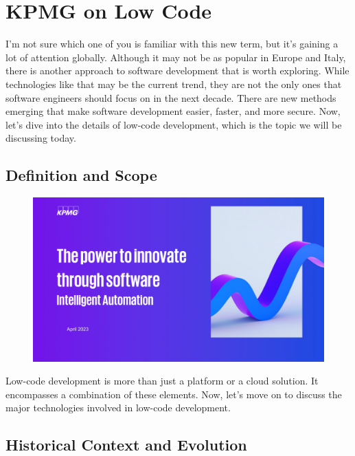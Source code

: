 \section{KPMG on Low Code}\label{introduction-to-low-code-development}

I'm not sure which one of you is familiar with this new term, but it's
gaining a lot of attention globally. Although it may not be as popular
in Europe and Italy, there is another approach to software development
that is worth exploring. While technologies like that may be the current
trend, they are not the only ones that software engineers should focus
on in the next decade. There are new methods emerging that make software
development easier, faster, and more secure. Now, let's dive into the
details of low-code development, which is the topic we will be
discussing today.

\subsection{Definition and Scope}\label{definition-and-scope}

\begin{figure}[!h]
    \centering
    \includegraphics[page=7, trim = 2cm 2cm 2cm 0cm, clip, width=\textwidth]{images/02 - KPMG_intelligent_automation_2.pdf}
\end{figure}

Low-code development is more than just a platform or a cloud solution.
It encompasses a combination of these elements. Now, let's move on
to discuss the major technologies involved in low-code development.

\subsection{Historical Context and
    Evolution}\label{historical-context-and-evolution}

